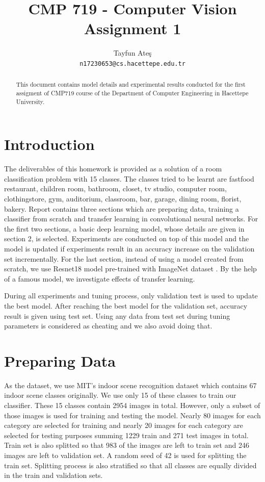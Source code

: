 \documentclass{article}
\title{CMP 719 - Computer Vision Assignment 1}
\author{
  Tayfun Ateş \\
  \texttt{n17230653@cs.hacettepe.edu.tr} \\
}
\begin{document}
\maketitle


\begin{abstract}

This document contains model details and experimental results conducted for the first assigment
of CMP719 course of the Department of Computer Engineering in Hacettepe University.

\end{abstract}

\section{Introduction}

 The deliverables of this homework is provided as a solution of a room classification problem with 15 classes. The classes tried to be learnt are fastfood restaurant, children room, bathroom, closet, tv studio, computer room, clothingstore, gym, auditorium, classroom, bar, garage, dining room, florist, bakery. Report contains three sections which are preparing data, training a classifier from scratch and transfer learning in convolutional neural networks. For the first two sections, a basic deep learning model, whose details are given in section 2, is selected. Experiments are conducted on top of this model and the model is updated if experiments result in an accuracy increase on the validation set incrementally. For the last section, instead of using a model created from scratch, we use Resnet18 model \cite{he2016deep} pre-trained with ImageNet dataset  \cite{russakovsky2015imagenet}. By the help of a famous model, we investigate effects of transfer learning. 
 
 During all experiments and tuning process, only validation test is used to update the best model. After reaching the best model for the validation set, accuracy result is given using test set. Using any data from test set during tuning parameters is considered as cheating and we also avoid doing that.

\section{Preparing Data}

As the dataset, we use MIT's indoor scene recognition dataset \cite{quattoni2009recognizing} which contains 67 indoor scene classes originally. We use only 15 of these classes to train our classifier. These 15 classes contain 2954 images in total. However, only a subset of those images is used for training and testing the model. Nearly 80 images for each category are selected for training and nearly 20 images for each category are selected for testing purposes summing 1229 train and 271 test images in total. Train set is also splitted so that 983 of the images are left to train set and 246 images are left to validation set. A random seed of 42 is used for splitting the train set. Splitting process is also stratified so that all classes are equally divided in the train and validation sets.
\end{document}
